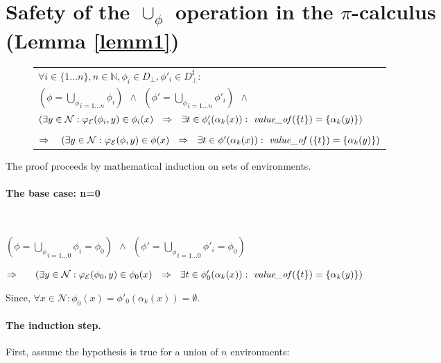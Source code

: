 \documentclass[10pt,a4paper,final,oneside,fleqn]{book}
\begin{document}
\section{Safety of the $\cup_\phi$ operation in the $\pi$-calculus\\(Lemma \ref{lemm1})\label{applemm1}}
\begin{figure*}[bht]
\begin{tabular}{|l|}\hline
\noindent
$\forall i\in \{1\ldots n\},n\in\mathbb{N},\phi_i\in D_\bot,\phi'_i\in D^\sharp_\bot:$\\
$(\phi=\underset{i=1\ldots n}{\bigcup_\phi}\phi_i)~~\wedge~~(\phi'=\underset{i=1\ldots n}{\bigcup_\phi}\phi'_i)~~\wedge$\\
$(\exists y\in\mathcal{N}:\varphi_\mathcal{E}(\phi_i,y)\in\phi_i(x)~~\Rightarrow~~\exists t\in\phi'_i(\alpha_k(x)):~\mbox{{\itshape value\_of\/}}(\{t\})=\{\alpha_k(y)\})$\\\\

\noindent
$\Rightarrow~~~(\exists y\in\mathcal{N}:\varphi_\mathcal{E}(\phi,y)\in\phi(x)~~\Rightarrow~~\exists t\in\phi'(\alpha_k(x)):~\mbox{{\itshape value\_of \/}}(\{t\})=\{\alpha_k(y)\})$\\\hline
\end{tabular}
\end{figure*}

\noindent
The proof proceeds by mathematical induction on sets of environments.
\paragraph{The base case: n=0}
$ $

\noindent
$(\phi=\underset{i=1\ldots 0}{\bigcup_\phi}\phi_i=\phi_{0})~~\wedge~~(\phi'=\underset{i=1\ldots 0}{\bigcup_\phi}\phi'_i=\phi_{0})$\vspace{5mm}

\noindent
$\Rightarrow~~~~~(\exists y\in\mathcal{N}:\varphi_\mathcal{E}(\phi_0,y)\in\phi_0(x)~~\Rightarrow~~\exists t\in\phi'_0(\alpha_k(x)):~\mbox{{\itshape value\_of\/}}(\{t\})=\{\alpha_k(y)\})$ \vspace{5mm}

\noindent
Since, $\forall x\in\mathcal{N}:\phi_0(x)=\phi'_0(\alpha_k(x))=\emptyset$.

\paragraph{The induction step.}
First, assume the hypothesis is true for a union of $n$ environments:
\end{document}
